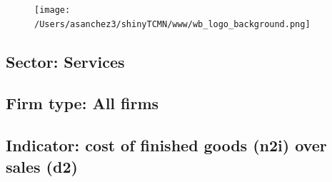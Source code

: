 \documentclass{article}\usepackage[]{graphicx}\usepackage[]{color}
\begin{document}
%

\begin{figure}
  \vspace{-3ex} %
  \hspace{-7ex} %
  \texttt{[image: /Users/asanchez3/shinyTCMN/www/wb\_logo\_background.png]}
\end{figure}
 \begin{minipage}[t]{1.1\textwidth} %
      \vspace{-30ex}
      \hspace{10ex}
  \end{minipage}
  
%
\begin{minipage}[t]{0.99\textwidth} %
  \vspace{-0.5cm}
      \subsection*{\color{white!40!black}Sector: \color{blue!40!black}Services}
      \subsection*{\color{white!40!black}Firm type: \color{blue!40!black}All firms}
      \subsection*{\color{white!40!black}Indicator: \color{blue!40!black}cost of finished goods (n2i) over sales (d2)}
  \end{minipage} %
\end{document}
